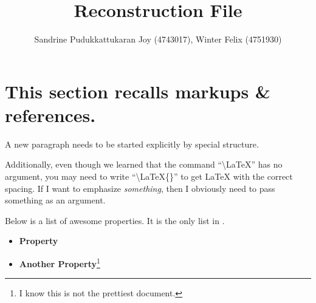 \documentclass{article}
\title{Reconstruction File}
\author{Sandrine Pudukkattukaran Joy (4743017), Winter Felix (4751930)}
\begin{document}
\maketitle

\section{This section recalls markups \& references.}\label{sec:markup}A new paragraph needs to be started explicitly by special structure.

Additionally, even though we learned that the command ``\textbackslash LaTeX'' has no argument, you may need to write ``\textbackslash LaTeX\{\}'' to get \LaTeX{} with the correct spacing.
If I want to emphasize \emph{something}, then I obviously need to pass something as an argument.

Below is a list of awesome properties.
It is the only list in .

\begin{itemize}
    \item \textbf{Property} 
    \item \textbf{Another Property}\footnote{I know this is not the prettiest document.}
\end{itemize}
\end{document}
